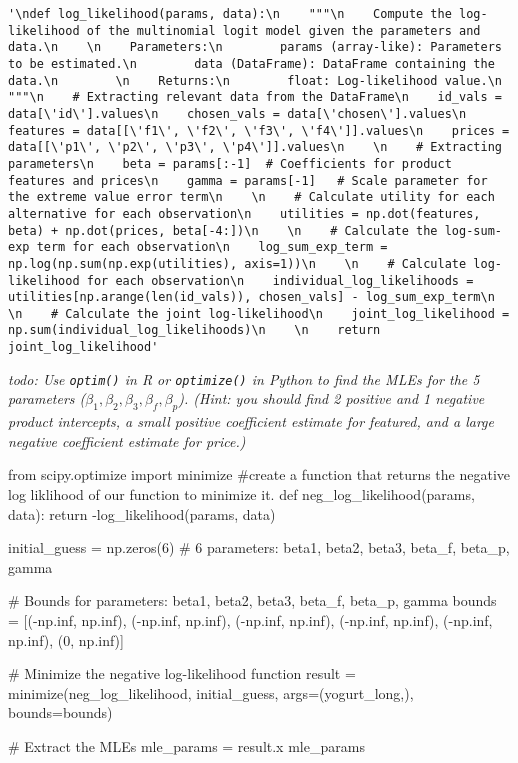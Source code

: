 \documentclass[
  letterpaper,
  DIV=11,
  numbers=noendperiod]{scrartcl}
\newenvironment{Shaded}{\begin{snugshade}}{\end{snugshade}}
\newcommand{\CommentTok}[1]{\textcolor[rgb]{0.37,0.37,0.37}{#1}}
\begin{document}
\begin{verbatim}
'\ndef log_likelihood(params, data):\n    """\n    Compute the log-likelihood of the multinomial logit model given the parameters and data.\n    \n    Parameters:\n        params (array-like): Parameters to be estimated.\n        data (DataFrame): DataFrame containing the data.\n        \n    Returns:\n        float: Log-likelihood value.\n    """\n    # Extracting relevant data from the DataFrame\n    id_vals = data[\'id\'].values\n    chosen_vals = data[\'chosen\'].values\n    features = data[[\'f1\', \'f2\', \'f3\', \'f4\']].values\n    prices = data[[\'p1\', \'p2\', \'p3\', \'p4\']].values\n    \n    # Extracting parameters\n    beta = params[:-1]  # Coefficients for product features and prices\n    gamma = params[-1]   # Scale parameter for the extreme value error term\n    \n    # Calculate utility for each alternative for each observation\n    utilities = np.dot(features, beta) + np.dot(prices, beta[-4:])\n    \n    # Calculate the log-sum-exp term for each observation\n    log_sum_exp_term = np.log(np.sum(np.exp(utilities), axis=1))\n    \n    # Calculate log-likelihood for each observation\n    individual_log_likelihoods = utilities[np.arange(len(id_vals)), chosen_vals] - log_sum_exp_term\n    \n    # Calculate the joint log-likelihood\n    joint_log_likelihood = np.sum(individual_log_likelihoods)\n    \n    return joint_log_likelihood'
\end{verbatim}

\emph{todo: Use \texttt{optim()} in R or \texttt{optimize()} in Python
to find the MLEs for the 5 parameters
(\(\beta_1, \beta_2, \beta_3, \beta_f, \beta_p\)). (Hint: you should
find 2 positive and 1 negative product intercepts, a small positive
coefficient estimate for featured, and a large negative coefficient
estimate for price.)}

\begin{Shaded}
\begin{Highlighting}[]
\CommentTok{\textquotesingle{}\textquotesingle{}\textquotesingle{}}
\CommentTok{from scipy.optimize import minimize}
\CommentTok{\#create a function that returns the negative log liklihood of our function to minimize it.}
\CommentTok{def neg\_log\_likelihood(params, data):}
\CommentTok{    return {-}log\_likelihood(params, data)}

\CommentTok{initial\_guess = np.zeros(6)  \# 6 parameters: beta1, beta2, beta3, beta\_f, beta\_p, gamma}

\CommentTok{\# Bounds for parameters: beta1, beta2, beta3, beta\_f, beta\_p, gamma}
\CommentTok{bounds = [({-}np.inf, np.inf), ({-}np.inf, np.inf), ({-}np.inf, np.inf), ({-}np.inf, np.inf), ({-}np.inf, np.inf), (0, np.inf)]}

\CommentTok{\# Minimize the negative log{-}likelihood function}
\CommentTok{result = minimize(neg\_log\_likelihood, initial\_guess, args=(yogurt\_long,), bounds=bounds)}

\CommentTok{\# Extract the MLEs}
\CommentTok{mle\_params = result.x}
\CommentTok{mle\_params\textquotesingle{}\textquotesingle{}\textquotesingle{}}
\end{Highlighting}
\end{Shaded}
\end{document}
